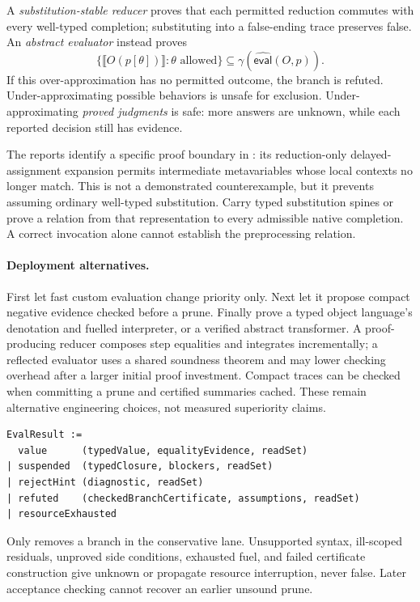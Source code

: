 A \emph{substitution-stable reducer} proves that each permitted reduction
commutes with every well-typed completion; substituting into a false-ending
trace preserves false. An \emph{abstract evaluator} instead proves
\[
 \{\llbracket O(p[\theta])\rrbracket:\theta\text{ allowed}\}
 \subseteq\gamma(\widehat{\mathsf{eval}}(O,p)).
\]
If this over-approximation has no permitted outcome, the branch is refuted.
Under-approximating possible behaviors is unsafe for exclusion.
Under-approximating \emph{proved judgments} is safe: more answers are unknown,
while each reported decision still has evidence.

The reports identify a specific proof boundary in :
its reduction-only delayed-assignment expansion permits intermediate
metavariables whose local contexts no longer match. This is not a demonstrated
counterexample, but it prevents assuming ordinary well-typed substitution.
Carry typed substitution spines or prove a relation from that representation
to every admissible native completion. A correct  invocation
alone cannot establish the preprocessing relation.

\paragraph{Deployment alternatives.}\label{sec:evaluation-deployment}
First let fast custom evaluation change priority only. Next let it propose
compact negative evidence checked before a prune. Finally prove a typed object
language's denotation and fuelled interpreter, or a verified abstract
transformer. A proof-producing reducer composes step equalities and integrates
incrementally; a reflected evaluator uses a shared soundness theorem and may
lower checking overhead after a larger initial proof investment. Compact
traces can be checked when committing a prune and certified summaries cached.
These remain alternative engineering choices, not measured superiority claims.

\begin{lstlisting}[caption={Proposed evidence-bearing evaluation interface; pseudocode.}]
EvalResult :=
  value      (typedValue, equalityEvidence, readSet)
| suspended  (typedClosure, blockers, readSet)
| rejectHint (diagnostic, readSet)
| refuted    (checkedBranchCertificate, assumptions, readSet)
| resourceExhausted
\end{lstlisting}
Only  removes a branch in the conservative lane. Unsupported
syntax, ill-scoped residuals, unproved side conditions, exhausted fuel, and
failed certificate construction give unknown or propagate resource interruption,
never false. Later acceptance checking cannot recover an earlier unsound prune.


